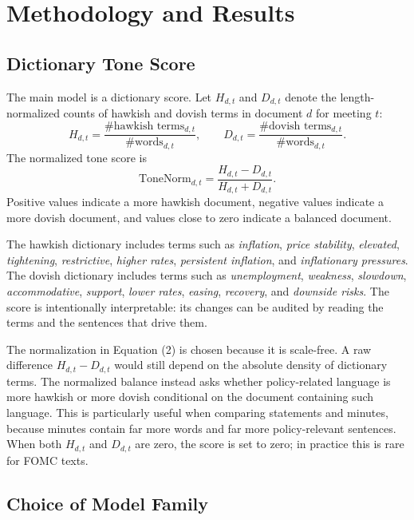 \documentclass{article}
\begin{document}
\section{Methodology and Results}

\subsection{Dictionary Tone Score}

The main model is a dictionary score. Let $H_{d,t}$ and $D_{d,t}$
denote the length-normalized counts of hawkish and dovish terms in document
$d$ for meeting $t$:
\begin{equation}
H_{d,t} = \frac{\#\text{hawkish terms}_{d,t}}{\#\text{words}_{d,t}},
\qquad
D_{d,t} = \frac{\#\text{dovish terms}_{d,t}}{\#\text{words}_{d,t}}.
\end{equation}
The normalized tone score is
\begin{equation}
\text{ToneNorm}_{d,t} =
\frac{H_{d,t}-D_{d,t}}{H_{d,t}+D_{d,t}}.
\end{equation}
Positive values indicate a more hawkish document, negative values indicate a more
dovish document, and values close to zero indicate a balanced document.

The hawkish dictionary includes terms such as \emph{inflation},
\emph{price stability}, \emph{elevated}, \emph{tightening},
\emph{restrictive}, \emph{higher rates}, \emph{persistent inflation}, and
\emph{inflationary pressures}. The dovish dictionary includes terms such as
\emph{unemployment}, \emph{weakness}, \emph{slowdown}, \emph{accommodative},
\emph{support}, \emph{lower rates}, \emph{easing}, \emph{recovery}, and
\emph{downside risks}. The score is intentionally interpretable: its changes can
be audited by reading the terms and the sentences that drive them.

The normalization in Equation (2) is chosen because it is scale-free. A raw
difference $H_{d,t}-D_{d,t}$ would still depend on the absolute density of
dictionary terms. The normalized balance instead asks whether policy-related
language is more hawkish or more dovish conditional on the document containing
such language. This is particularly useful when comparing statements and minutes,
because minutes contain far more words and far more policy-relevant sentences.
When both $H_{d,t}$ and $D_{d,t}$ are zero, the score is set to zero; in practice
this is rare for FOMC texts.

\subsection{Choice of Model Family}
\end{document}
